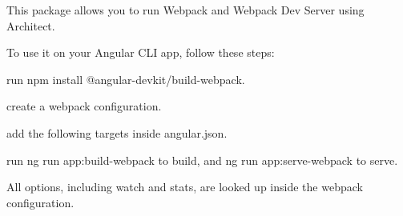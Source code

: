 This package allows you to run Webpack and Webpack Dev Server using Architect.

To use it on your Angular CLI app, follow these steps\+:


\begin{DoxyItemize}
\item run {\ttfamily npm install @angular-\/devkit/build-\/webpack}.
\item create a webpack configuration.
\item add the following targets inside {\ttfamily angular.\+json}. 
\begin{DoxyCode}{0}
\DoxyCodeLine{        \}}
\DoxyCodeLine{      \},}
\DoxyCodeLine{        \}}
\DoxyCodeLine{      \}}
\DoxyCodeLine{    \}}

\end{DoxyCode}

\item run {\ttfamily ng run app\+:build-\/webpack} to build, and {\ttfamily ng run app\+:serve-\/webpack} to serve.
\end{DoxyItemize}

All options, including {\ttfamily watch} and {\ttfamily stats}, are looked up inside the webpack configuration. 